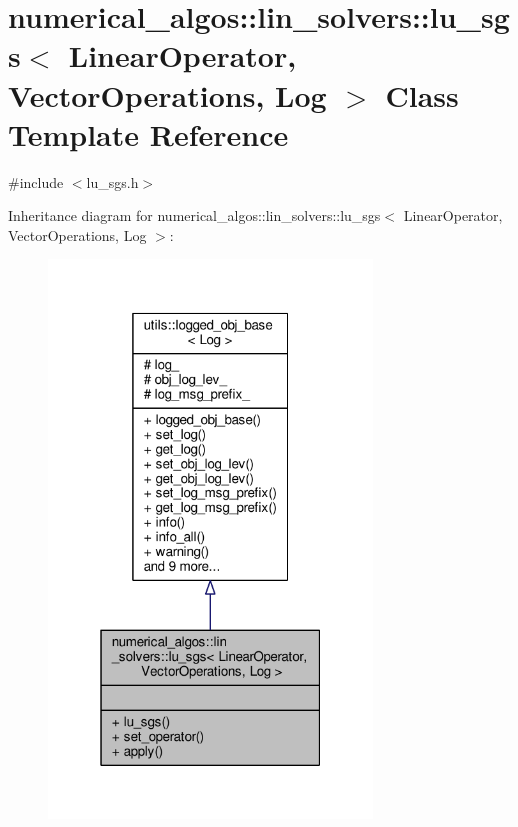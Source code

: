\hypertarget{classnumerical__algos_1_1lin__solvers_1_1lu__sgs}{\section{numerical\-\_\-algos\-:\-:lin\-\_\-solvers\-:\-:lu\-\_\-sgs$<$ Linear\-Operator, Vector\-Operations, Log $>$ Class Template Reference}
\label{classnumerical__algos_1_1lin__solvers_1_1lu__sgs}
}


{\ttfamily \#include $<$lu\-\_\-sgs.\-h$>$}



Inheritance diagram for numerical\-\_\-algos\-:\-:lin\-\_\-solvers\-:\-:lu\-\_\-sgs$<$ Linear\-Operator, Vector\-Operations, Log $>$\-:\nopagebreak
\begin{figure}[H]
\begin{center}
\leavevmode
\includegraphics[width=244pt]{classnumerical__algos_1_1lin__solvers_1_1lu__sgs__inherit__graph}
\end{center}
\end{figure}


